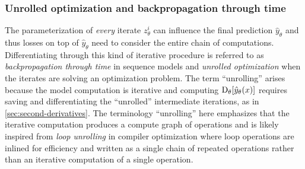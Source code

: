 \subsubsection{Unrolled optimization and backpropagation through time}
\label{sec:unrolled}
\begin{center}
\end{center}
\vspace{-10mm}

The parameterization of \emph{every} iterate $z_\theta^i$ can
influence the final prediction $\hat y_\theta$ and thus
losses on top of $\hat y_\theta$ need to consider the
entire chain of computations.
Differentiating through this kind of iterative procedure
is referred to as \emph{backpropagation through time}
in sequence models and \emph{unrolled optimization}
\citep{pearlmutter2008reverse,zhang2010multi,maclaurin2015gradient,belanger2016structured,metz2016unrolled,finn2017model,han2017alternating,belanger2017end,belanger2017deep,foerster2017learning,bhardwaj2020differentiable,monga2021algorithm}
when the iterates are solving an optimization problem.
The term ``unrolling'' arises because the model computation
is iterative and computing
$\mathrm{D}_\theta[\hat y_\theta(x)]$
requires saving and differentiating the ``unrolled''
intermediate iterations, as in \cref{sec:second-derivatives}.
The terminology ``unrolling'' here emphasizes that the
iterative computation produces a compute graph of operations
and is likely inspired from
\emph{loop unrolling} in compiler optimization
\citep{aho1986compilers,davidson1995aggressive} where
loop operations are inlined for efficiency and written
as a single chain of repeated operations rather
than an iterative computation of a single operation.

